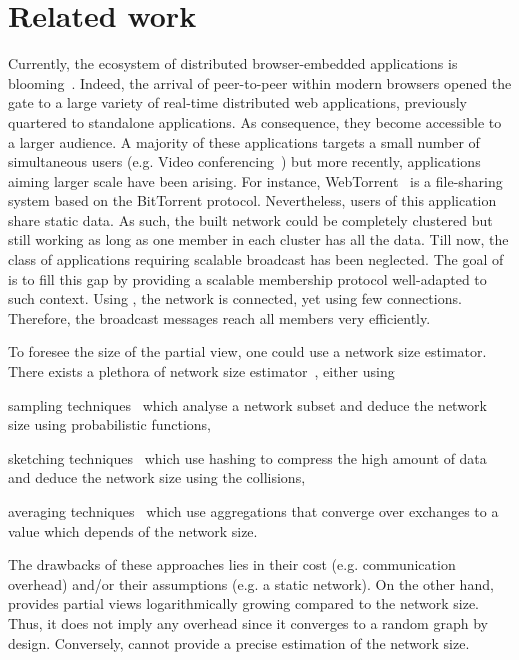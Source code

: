 
\section{Related work}
\label{sec:relatedwork}

Currently, the ecosystem of distributed browser-embedded applications is
blooming~\cite{firefoxhello,sharefest,webtorrent}. Indeed, the arrival of
peer-to-peer within modern browsers opened the gate to a large variety of
real-time distributed web applications, previously quartered to standalone
applications. As consequence, they become accessible to a larger audience. A
majority of these applications targets a small number of simultaneous users
(e.g. Video conferencing~\cite{firefoxhello}) but more recently, applications
aiming larger scale have been arising. For instance,
WebTorrent~\cite{webtorrent} is a file-sharing system based on the BitTorrent
protocol. Nevertheless, users of this application share static data. As such,
the built network could be completely clustered but still working as long as
one member in each cluster has all the data.  Till now, the class of
applications requiring scalable broadcast has been neglected. The goal of
\SCAMPLON{} is to fill this gap by providing a scalable membership protocol
well-adapted to such context. Using \SCAMPLON{}, the network is connected, yet
using few connections. Therefore, the broadcast messages reach all members very
efficiently.

To foresee the size of the partial view, one could use a network size
estimator. There exists a plethora of network size
estimator~\cite{jelasity2004epidemic, ganesh2007peer, kostoulas2007active,
  baquero2012extrema}, either using
\begin{inparaenum}[(i)]
\item sampling techniques~\cite{mane05network, ganesh2007peer,
    kostoulas2007active} which analyse a network subset and deduce the network
  size using probabilistic functions,
\item sketching techniques~\cite{baquero2012extrema} which use hashing to
  compress the high amount of data and deduce the network size using the
  collisions,
\item averaging techniques~\cite{jelasity2004epidemic} which use aggregations
  that converge over exchanges to a value which depends of the network size.
\end{inparaenum}
The drawbacks of these approaches lies in their cost (e.g. communication
overhead) and/or their assumptions (e.g. a static network). On the other hand,
\SCAMPLON{} provides partial views logarithmically growing compared to the
network size. Thus, it does not imply any overhead since it converges to a
random graph by design. Conversely, \SCAMPLON{} cannot provide a precise
estimation of the network size.

